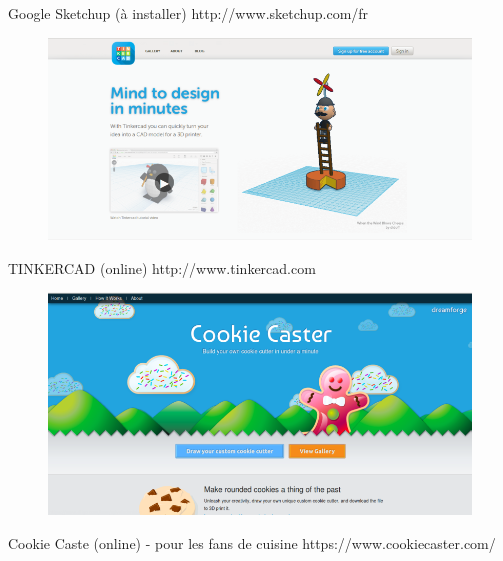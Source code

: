 \documentclass{article}
\begin{document}
 \par\leavevmode\par
Google Sketchup (à installer)
http://www.sketchup.com/fr
\begin{figure}[h!]
\centering
\includegraphics[scale=0.3]{./images/tinkercad.png}
\end{figure}\hfill
 \par\leavevmode\par
TINKERCAD (online)
http://www.tinkercad.com
\begin{figure}[h!]
\centering
\includegraphics[scale=0.3]{./images/cookiecaster.png}
\end{figure}\hfill 
 \par\leavevmode\par
Cookie Caste (online) - pour les fans de cuisine
https://www.cookiecaster.com/
\newpage
\end{document}
